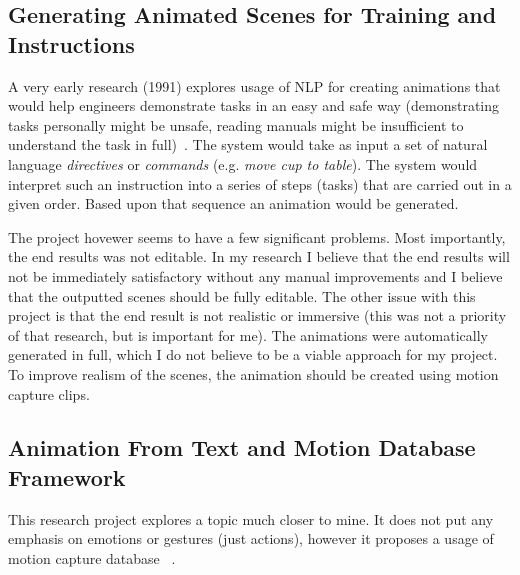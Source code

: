 \subsection{Generating Animated Scenes for Training and Instructions}
A very early research (1991) explores usage of NLP for creating animations that would help engineers demonstrate tasks in an easy and safe way (demonstrating tasks personally might be unsafe, reading manuals might be insufficient to understand the task in full)~\cite{animosha}. The system would take as input a set of natural language \textit{directives} or \textit{commands} (e.g. \textit{move cup to table}). The system would interpret such an instruction into a series of steps (tasks) that are carried out in a given order. Based upon that sequence an animation would be generated.

The project hovewer seems to have a few significant problems. Most importantly, the end results was not editable. In my research I believe that the end results will not be immediately satisfactory without any manual improvements and I believe that the outputted scenes should be fully editable. The other issue with this project is that the end result is not realistic or immersive (this was not a priority of that research, but is important for me). The animations were automatically generated in full, which I do not believe to be a viable approach for my project. To improve realism of the scenes, the animation should be created using motion capture clips.

\subsection{Animation From Text and Motion Database Framework}
This research project explores a topic much closer to mine. It does not put any emphasis on emotions or gestures (just actions), however it proposes a usage of motion capture database ~\cite{animmc}.




